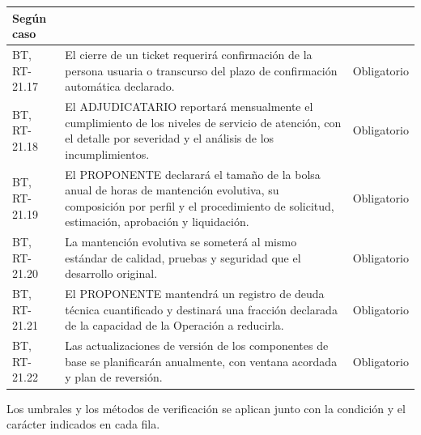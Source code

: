 \begin{longtable}{|L{0.098425\AnchoTablaAnexo}|L{0.814961\AnchoTablaAnexo}|L{0.086614\AnchoTablaAnexo}|}
Según caso \\ \hline
{}
BT, RT-21.17 &
El cierre de un ticket requerirá confirmación de la persona usuaria o transcurso del plazo de confirmación automática declarado. &
Obligatorio \\ \hline
BT, RT-21.18 &
El ADJUDICATARIO reportará mensualmente el cumplimiento de los niveles de servicio de atención, con el detalle por severidad y el análisis de los incumplimientos. &
Obligatorio \\ \hline
{}
BT, RT-21.19 &
El PROPONENTE declarará el tamaño de la bolsa anual de horas de mantención evolutiva, su composición por perfil y el procedimiento de solicitud, estimación, aprobación y liquidación. &
Obligatorio \\ \hline
BT, RT-21.20 &
La mantención evolutiva se someterá al mismo estándar de calidad, pruebas y seguridad que el desarrollo original. &
Obligatorio \\ \hline
{}
BT, RT-21.21 &
El PROPONENTE mantendrá un registro de deuda técnica cuantificado y destinará una fracción declarada de la capacidad de la Operación a reducirla. &
Obligatorio \\ \hline
BT, RT-21.22 &
Las actualizaciones de versión de los componentes de base se planificarán anualmente, con ventana acordada y plan de reversión. &
Obligatorio \\ \hline
\end{longtable}

Los umbrales y los métodos de verificación se aplican junto con la condición y el carácter indicados en cada fila.
